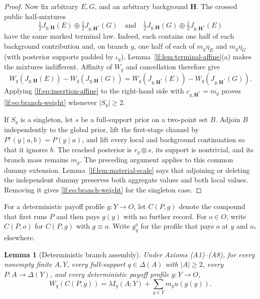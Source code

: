 \documentclass[11pt,a4paper]{article}
\newtheorem{lemma}[theorem]{Lemma}
\theoremstyle{definition}
\newcommand{\D}{\Delta}
\newcommand{\1}{\mathbf 1}
\begin{document}
\begin{proof}
Now fix arbitrary $E,G$, and an arbitrary background $\mathbf H$.  The crossed
public half-mixtures
\[
\tfrac12J_{y,\mathbf H}(E)
\oplus\tfrac12J_{y,\mathbf H^\ast}(G)
\quad\text{and}\quad
\tfrac12J_{y,\mathbf H}(G)
\oplus\tfrac12J_{y,\mathbf H^\ast}(E)
\]
have the same marked terminal law.  Indeed, each contains one half of each
background contribution and, on branch $y$, one half of each of
$m_y\eta_E$ and $m_y\eta_G$ (with posterior supports padded by $\iota_y$).
Lemma~\ref{lf:lem:terminal-affine}\textup{(a)} makes the mixtures indifferent.
Affinity of $W_q$ and cancellation therefore give
\[
W_q(J_{y,\mathbf H}(E))-W_q(J_{y,\mathbf H}(G))
=W_q(J_{y,\mathbf H^\ast}(E))-W_q(J_{y,\mathbf H^\ast}(G)).
\]
Applying \eqref{lf:eq:insertion-affine} to the right-hand side with
$c_{y,\mathbf H^\ast}=m_y$ proves \eqref{lf:eq:branch-weight} whenever
$\lvert S_y\rvert\ge2$.

If $S_y$ is a singleton, let $s$ be a full-support prior on a two-point set
$B$.  Adjoin $B$ independently to the global prior, lift the first-stage
channel by $P^\uparrow(y\mid a,b)=P(y\mid a)$, and lift every local and
background continuation so that it ignores $b$.  The reached posterior is
$r_y\otimes s$, its support is nontrivial, and its branch mass remains $m_y$.
The preceding argument applies to this common dummy extension.
Lemma~\ref{lf:lem:material-scale} says that adjoining or deleting the
independent dummy preserves both aggregate values and both local values.
Removing it gives \eqref{lf:eq:branch-weight} for the singleton case.
\end{proof}

For a deterministic payoff profile $g:Y\to O$, let $C(P,g)$ denote the
compound that first runs $P$ and then pays $g(y)$ with no further record.
For $o\in O$, write $C(P,o)$ for $C(P,g)$ with $g\equiv o$.
Write $g_y^o$ for the profile that pays $o$ at $y$ and $o_\ast$ elsewhere.

\begin{lemma}[Deterministic branch assembly]
\label{lf:lem:deterministic-assembly}\label{lf:lem:branch-increment}
Under Axioms \textup{(A1)--(A8)}, for every nonempty finite $A,Y$, every
full-support $q\in\D(A)$ with $\lvert A\rvert\ge2$, every
$P:A\to\D(Y)$, and every deterministic payoff profile $g:Y\to O$,
\begin{equation}
W_q(C(P,g))
=\lambda I_q(A;Y)+\sum_{y\in Y}m_yu(g(y)).
\label{lf:eq:deterministic-assembly}
\end{equation}
\end{lemma}
\end{document}
